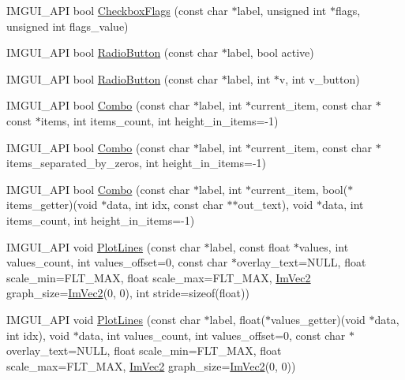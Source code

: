 \begin{DoxyCompactItemize}
I\+M\+G\+U\+I\+\_\+\+A\+PI bool \hyperlink{namespace_im_gui_aeca400dcf5a82c312b3e669d2fe6e88d}{Checkbox\+Flags} (const char $\ast$label, unsigned int $\ast$flags, unsigned int flags\+\_\+value)
\item 
I\+M\+G\+U\+I\+\_\+\+A\+PI bool \hyperlink{namespace_im_gui_a6b146763845cbad5a4144772279631bc}{Radio\+Button} (const char $\ast$label, bool active)
\item 
I\+M\+G\+U\+I\+\_\+\+A\+PI bool \hyperlink{namespace_im_gui_a018d2b61d2f00bb7a9dd2b1f933b93a5}{Radio\+Button} (const char $\ast$label, int $\ast$v, int v\+\_\+button)
\item 
I\+M\+G\+U\+I\+\_\+\+A\+PI bool \hyperlink{namespace_im_gui_ae801624ec02dac3b2b03321fffd91f1a}{Combo} (const char $\ast$label, int $\ast$current\+\_\+item, const char $\ast$const $\ast$items, int items\+\_\+count, int height\+\_\+in\+\_\+items=-\/1)
\item 
I\+M\+G\+U\+I\+\_\+\+A\+PI bool \hyperlink{namespace_im_gui_ae80520312b19a7039b77d2bafcbda8e5}{Combo} (const char $\ast$label, int $\ast$current\+\_\+item, const char $\ast$items\+\_\+separated\+\_\+by\+\_\+zeros, int height\+\_\+in\+\_\+items=-\/1)
\item 
I\+M\+G\+U\+I\+\_\+\+A\+PI bool \hyperlink{namespace_im_gui_a65d00f64f98ccb810bdb75721612948c}{Combo} (const char $\ast$label, int $\ast$current\+\_\+item, bool($\ast$items\+\_\+getter)(void $\ast$data, int idx, const char $\ast$$\ast$out\+\_\+text), void $\ast$data, int items\+\_\+count, int height\+\_\+in\+\_\+items=-\/1)
\item 
I\+M\+G\+U\+I\+\_\+\+A\+PI void \hyperlink{namespace_im_gui_a2bc21c56e4796855313804086cca114f}{Plot\+Lines} (const char $\ast$label, const float $\ast$values, int values\+\_\+count, int values\+\_\+offset=0, const char $\ast$overlay\+\_\+text=N\+U\+LL, float scale\+\_\+min=F\+L\+T\+\_\+\+M\+AX, float scale\+\_\+max=F\+L\+T\+\_\+\+M\+AX, \hyperlink{struct_im_vec2}{Im\+Vec2} graph\+\_\+size=\hyperlink{struct_im_vec2}{Im\+Vec2}(0, 0), int stride=sizeof(float))
\item 
I\+M\+G\+U\+I\+\_\+\+A\+PI void \hyperlink{namespace_im_gui_a94a2645d45c96da35b834dc7db93a9f1}{Plot\+Lines} (const char $\ast$label, float($\ast$values\+\_\+getter)(void $\ast$data, int idx), void $\ast$data, int values\+\_\+count, int values\+\_\+offset=0, const char $\ast$overlay\+\_\+text=N\+U\+LL, float scale\+\_\+min=F\+L\+T\+\_\+\+M\+AX, float scale\+\_\+max=F\+L\+T\+\_\+\+M\+AX, \hyperlink{struct_im_vec2}{Im\+Vec2} graph\+\_\+size=\hyperlink{struct_im_vec2}{Im\+Vec2}(0, 0))
$$
\end{DoxyCompactItemize}
